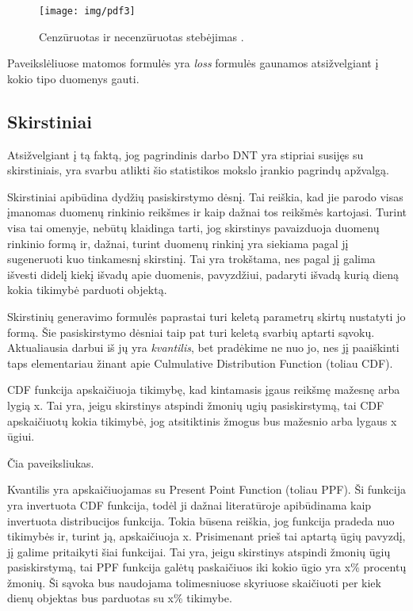 \documentclass{VUMIFPSkursinis}
\begin{document}
\begin{figure}[H]
  \centering
  \texttt{[image: img/pdf3]}
  \caption{ Cenzūruotas ir necenzūruotas stebėjimas \cite{WTTEBLOG}.}
  \label{img:pdf3}
\end{figure}

Paveikslėliuose matomos formulės yra \textit{loss} formulės gaunamos atsižvelgiant į kokio tipo duomenys gauti. 



\subsection{Skirstiniai}

Atsižvelgiant į tą faktą, jog pagrindinis darbo DNT yra stipriai susijęs su skirstiniais, yra svarbu atlikti šio statistikos mokslo įrankio pagrindų apžvalgą. 

Skirstiniai apibūdina dydžių pasiskirstymo dėsnį. Tai reiškia, kad jie parodo visas įmanomas duomenų rinkinio reikšmes ir kaip dažnai tos reikšmės kartojasi. Turint visa tai omenyje, nebūtų klaidinga tarti, jog skirstinys pavaizduoja duomenų rinkinio formą ir, dažnai, turint duomenų rinkinį yra siekiama pagal jį sugeneruoti kuo tinkamesnį skirstinį. Tai yra trokštama, nes pagal jį galima išvesti didelį kiekį išvadų apie duomenis, pavyzdžiui, padaryti išvadą kurią dieną kokia tikimybė parduoti objektą.

Skirstinių generavimo formulės paprastai turi keletą parametrų skirtų nustatyti jo formą. Šie pasiskirstymo dėsniai taip pat turi keletą svarbių aptarti sąvokų. Aktualiausia darbui iš jų yra \textit{kvantilis}, bet pradėkime ne nuo jo, nes jį paaiškinti taps elementariau žinant apie Culmulative Distribution Function (toliau CDF). 

CDF funkcija apskaičiuoja tikimybę, kad kintamasis įgaus reikšmę mažesnę arba lygią x. Tai yra, jeigu skirstinys atspindi žmonių ugių pasiskirstymą, tai CDF apskaičiuotų kokia tikimybė, jog atsitiktinis žmogus bus mažesnio arba lygaus x ūgiui. 

Čia paveiksliukas.

Kvantilis yra apskaičiuojamas su Present Point Function (toliau PPF). Ši funkcija yra invertuota CDF funkcija, todėl ji dažnai literatūroje apibūdinama kaip invertuota distribucijos funkcija. Tokia būsena reiškia, jog funkcija pradeda nuo tikimybės ir, turint ją, apskaičiuoja x. Prisimenant prieš tai aptartą ūgių pavyzdį, jį galime pritaikyti šiai funkcijai. Tai yra, jeigu skirstinys atspindi žmonių ūgių pasiskirstymą, tai PPF funkcija galėtų paskaičiuos iki kokio ūgio yra x\% procentų žmonių. Ši sąvoka bus naudojama tolimesniuose skyriuose skaičiuoti per kiek dienų objektas bus parduotas su x\% tikimybe.
\end{document}
